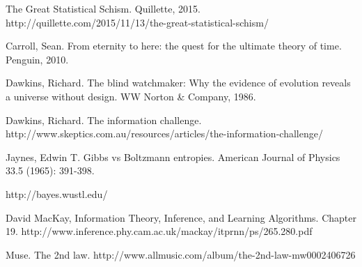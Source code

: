 \documentclass[a4paper, 12pt]{article}
\begin{document}
\begin{thebibliography}{999} %
 The Great Statistical Schism. Quillette, 2015.
http://quillette.com/2015/11/13/the-great-statistical-schism/

Carroll, Sean. From eternity to here: the quest for the ultimate theory of time. Penguin, 2010.

Dawkins, Richard. The blind watchmaker: Why the evidence of evolution reveals a universe without design. WW Norton \& Company, 1986.

Dawkins, Richard. The information challenge.
http://www.skeptics.com.au/resources/articles/the-information-challenge/

Jaynes, Edwin T.
Gibbs vs Boltzmann entropies. American Journal of Physics 33.5 (1965): 391-398.

http://bayes.wustl.edu/

David MacKay, Information Theory, Inference, and Learning Algorithms.
Chapter 19.
http://www.inference.phy.cam.ac.uk/mackay/itprnn/ps/265.280.pdf

Muse. The 2nd law.
http://www.allmusic.com/album/the-2nd-law-mw0002406726
\end{thebibliography}
\end{document}
